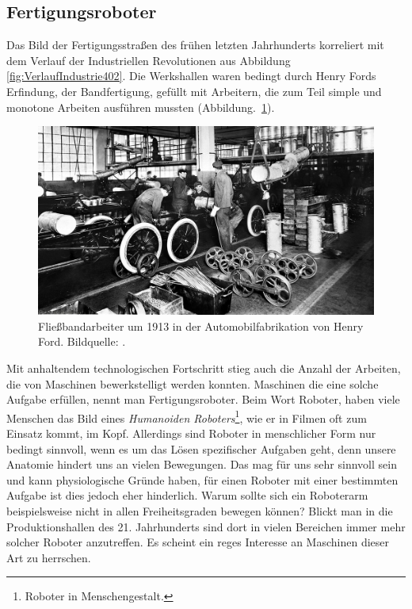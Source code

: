 \subsection{Fertigungsroboter}\label{ssec:industryRobots}
Das Bild der Fertigungsstraßen des frühen letzten Jahrhunderts korreliert mit dem Verlauf der Industriellen Revolutionen aus Abbildung \ref{fig:VerlaufIndustrie402}. Die Werkshallen waren bedingt durch Henry Fords Erfindung, der Bandfertigung, gefüllt mit Arbeitern, die zum Teil simple und monotone Arbeiten ausführen mussten (Abbildung.~\ref{fig:WerkshalleFord}).
\begin{figure}[H]
	\centering
	\includegraphics[width=1.\textwidth]{figuren/henry-ford-automobile}
	\caption{Fließbandarbeiter um 1913 in der Automobilfabrikation von Henry Ford. Bildquelle: \cite{ford}.}
	\label{fig:WerkshalleFord}
\end{figure}
Mit anhaltendem technologischen Fortschritt stieg auch die Anzahl der Arbeiten, die von Maschinen bewerkstelligt werden konnten. Maschinen die eine solche Aufgabe erfüllen, nennt man Fertigungsroboter. Beim Wort Roboter, haben viele Menschen das Bild eines \textit{Humanoiden Roboters}\footnote{ Roboter in Menschengestalt.}, wie er in Filmen oft zum Einsatz kommt, im Kopf. Allerdings sind Roboter in menschlicher Form nur bedingt sinnvoll, wenn es um das Lösen spezifischer Aufgaben geht, denn unsere Anatomie hindert uns an vielen Bewegungen. Das mag für uns sehr sinnvoll sein und kann physiologische Gründe haben, für einen Roboter mit einer bestimmten Aufgabe ist dies jedoch eher hinderlich. Warum sollte sich ein Roboterarm beispielsweise nicht in allen Freiheitsgraden bewegen können? Blickt man in die Produktionshallen des 21. Jahrhunderts sind dort in vielen Bereichen immer mehr solcher Roboter anzutreffen. Es scheint ein reges Interesse an Maschinen dieser Art zu herrschen.
